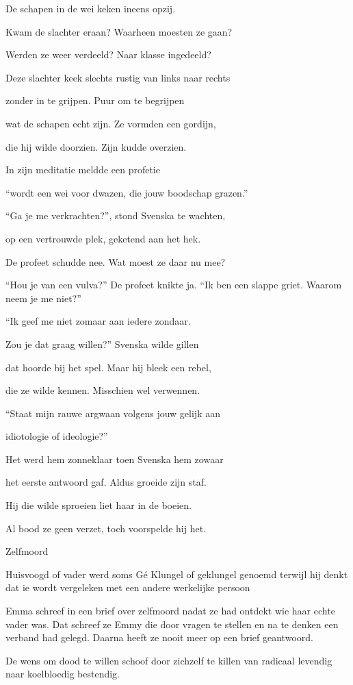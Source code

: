 De schapen in de wei
keken ineens opzij.

Kwam de slachter eraan?
Waarheen moesten ze gaan?

Werden ze weer verdeeld?
Naar klasse ingedeeld?

Deze slachter keek slechts
rustig van links naar rechts

zonder in te grijpen.
Puur om te begrijpen

wat de schapen echt zijn.
Ze vormden een gordijn,

die hij wilde doorzien.
Zijn kudde overzien.

In zijn meditatie
meldde een profetie

“wordt een wei voor dwazen,
die jouw boodschap grazen.”

“Ga je me verkrachten?”,
stond Svenska te wachten,

op een vertrouwde plek,
geketend aan het hek.

De profeet schudde nee.
Wat moest ze daar nu mee?

“Hou je van een vulva?”
De profeet knikte ja.
“Ik ben een slappe griet.
Waarom neem je me niet?”

“Ik geef me niet zomaar
aan iedere zondaar.

Zou je dat graag willen?”
Svenska wilde gillen

dat hoorde bij het spel.
Maar hij bleek een rebel,

die ze wilde kennen.
Misschien wel verwennen.

“Staat mijn rauwe argwaan
volgens jouw gelijk aan

idiotologie
of ideologie?”

Het werd hem zonneklaar
toen Svenska hem zowaar

het eerste antwoord gaf.
Aldus groeide zijn staf.

Hij die wilde sproeien
liet haar in de boeien.

Al bood ze geen verzet,
toch voorspelde hij het.

Zelfmoord

Huisvoogd of vader werd soms Gé Klungel of geklungel genoemd terwijl hij denkt dat ie wordt vergeleken met een andere werkelijke persoon

Emma schreef in een brief over zelfmoord nadat ze had ontdekt wie haar echte vader was. Dat schreef ze Emmy die door vragen te stellen en na te denken een verband had gelegd. Daarna heeft ze nooit meer op een brief geantwoord.

De wens om dood te willen
schoof door zichzelf te killen
van radicaal levendig
naar koelbloedig bestendig.

